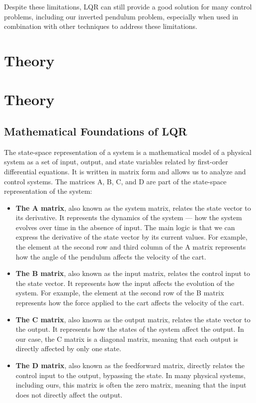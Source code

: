 \documentclass[11pt,twocolumn,twoside,lineno]{pnas-new}
\begin{document}
Despite these limitations, LQR can still provide a good solution for many control problems, including our inverted pendulum problem, especially when used in combination with other techniques to address these limitations.


\section{Theory}
\section{Theory}
\subsection{Mathematical Foundations of LQR}
The state-space representation of a system is a mathematical model of a physical system as a set of input, output, and state variables related by first-order differential equations. It is written in matrix form and allows us to analyze and control systems. The matrices A, B, C, and D are part of the state-space representation of the system:

\begin{itemize}
    \item \textbf{The A matrix}, also known as the system matrix, relates the state vector to its derivative. It represents the dynamics of the system — how the system evolves over time in the absence of input. The main logic is that we can express the derivative of the state vector by its current values. For example, the element at the second row and third column of the A matrix represents how the angle of the pendulum affects the velocity of the cart.
    \item \textbf{The B matrix}, also known as the input matrix, relates the control input to the state vector. It represents how the input affects the evolution of the system. For example, the element at the second row of the B matrix represents how the force applied to the cart affects the velocity of the cart.
    \item \textbf{The C matrix}, also known as the output matrix, relates the state vector to the output. It represents how the states of the system affect the output. In our case, the C matrix is a diagonal matrix, meaning that each output is directly affected by only one state.
    \item \textbf{The D matrix}, also known as the feedforward matrix, directly relates the control input to the output, bypassing the state. In many physical systems, including ours, this matrix is often the zero matrix, meaning that the input does not directly affect the output.
\end{itemize}
\end{document}
